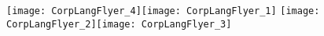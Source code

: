 \documentclass[12pt,oneside]{article}
\begin{document}
\texttt{[image: CorpLangFlyer\_4]}\texttt{[image: CorpLangFlyer\_1]}
\newpage
\texttt{[image: CorpLangFlyer\_2]}\texttt{[image: CorpLangFlyer\_3]}
\end{document}
